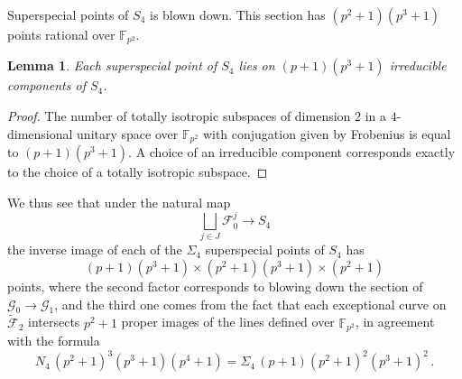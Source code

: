 \documentclass[11pt]{amsart}
\numberwithin{equation}{section}
\newcommand{\FF}{\mathbb F}
\newtheorem{lemma}[theorem]{Lemma}
\theoremstyle{definition}
\theoremstyle{remark}
\begin{document}
\begin{section}{Superspecial points of $S_4$}
is blown down. This section has $(p^2+1)(p^3+1)$ points rational over ${\FF}_{p^2}$.
\begin{lemma}
Each superspecial point of $S_4$ lies on $(p+1)(p^3+1)$ irreducible components of $S_4$.
\end{lemma}
\begin{proof}
The number of totally isotropic subspaces of dimension $2$ in a $4$-dimensional unitary
space over ${\FF}_{p^2}$ with conjugation given by Frobenius is  equal to $(p+1)(p^3+1)$. A choice of an irreducible component corresponds
exactly to the choice of a totally isotropic subspace.
\end{proof}
We thus see that under the natural map
$$
\bigsqcup_{j\in J} \mathcal{F}_0^j \longrightarrow S_4
$$
the inverse image of each of the $\Sigma_4$ superspecial points of $S_4$
has 
$$
(p+1)(p^3+1) \times (p^2+1)(p^3+1) \times (p^2+1)
$$ points, where the second factor corresponds to blowing down the section
of $\mathcal{G}_0 \to \mathcal{G}_1$, and the third one comes from the fact
that each exceptional curve on  $\tilde{\mathcal F}_2$ intersects $p^2+1$
proper images of the lines defined over ${\FF}_{p^2}$, in agreement with the formula
$$
N_4 \, (p^2+1)^3(p^3+1)(p^4+1)= \Sigma_4 \, (p+1)(p^2+1)^2(p^3+1)^2\, .
$$

\end{section}
\end{document}
